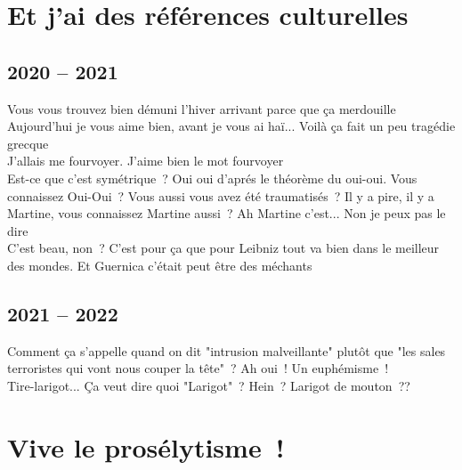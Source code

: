 \documentclass[french, a4paper, openany]{book}
\begin{document}
\section*{Et j'ai des références culturelles}

	\subsection*{2020 -- 2021}
		\noindent \og Vous vous trouvez bien démuni l'hiver arrivant parce que ça merdouille \fg \\
		\og Aujourd'hui je vous aime bien, avant je vous ai haï... Voilà ça fait un peu tragédie grecque \fg \\
		\og J'allais me fourvoyer. J'aime bien le mot fourvoyer \fg \\
		\og Est-ce que c'est symétrique~? Oui oui d'aprés le théorème du oui-oui. Vous connaissez Oui-Oui~? Vous aussi vous avez été traumatisés~? Il y a pire, il y a Martine, vous connaissez Martine aussi~? Ah Martine c'est... Non je peux pas le dire \fg \\
		\og C'est beau, non~? C'est pour ça que pour Leibniz tout va bien dans le meilleur des mondes. Et Guernica c'était peut être des méchants \fg \\	

	\subsection*{2021 -- 2022}
		\noindent \og Comment ça s'appelle quand on dit "intrusion malveillante" plutôt que "les sales terroristes qui vont nous couper la tête"~? Ah oui~! Un euphémisme~! \fg \\
		\og Tire-larigot... Ça veut dire quoi "Larigot"~? Hein~? Larigot de mouton~?? \fg \\

\section*{Vive le prosélytisme~!} 
\end{document}

